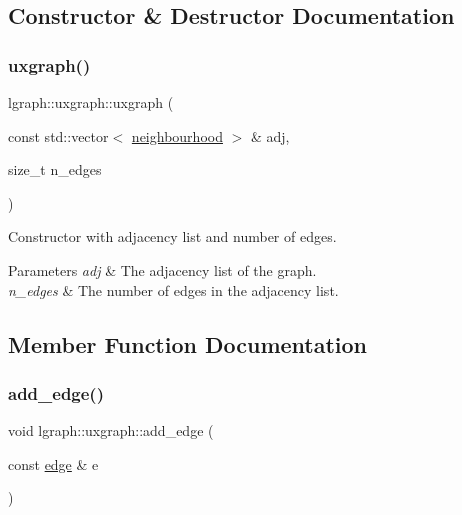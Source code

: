 \subsection{Constructor \& Destructor Documentation}
\mbox{\label{classlgraph_1_1uxgraph_a18a6a844ef0d8d719501216ef6c6bd76}} 
\subsubsection{\texorpdfstring{uxgraph()}{uxgraph()}}
{\footnotesize\ttfamily lgraph\+::uxgraph\+::uxgraph (\begin{DoxyParamCaption}\item[{const std\+::vector$<$ \hyperlink{namespacelgraph_a052e7766c13f3a43cec0aec8173fdede}{neighbourhood} $>$ \&}]{adj,  }\item[{size\+\_\+t}]{n\+\_\+edges }\end{DoxyParamCaption})}



Constructor with adjacency list and number of edges. 


\begin{DoxyParams}{Parameters}
{\em adj} & The adjacency list of the graph. \\
\hline
{\em n\+\_\+edges} & The number of edges in the adjacency list. \\
\hline
\end{DoxyParams}


\subsection{Member Function Documentation}
\mbox{\label{classlgraph_1_1uxgraph_a1a826ff50563bc4021e16d712f309232}} 
\subsubsection{\texorpdfstring{add\+\_\+edge()}{add\_edge()}\hspace{0.1cm}{\footnotesize\ttfamily [1/2]}}
{\footnotesize\ttfamily void lgraph\+::uxgraph\+::add\+\_\+edge (\begin{DoxyParamCaption}\item[{const \hyperlink{namespacelgraph_a76bd7d50719f03de7a85db259d80d572}{edge} \&}]{e }\end{DoxyParamCaption})}



